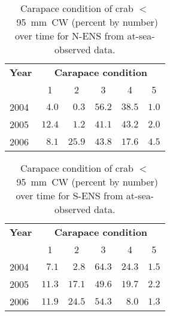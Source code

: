 \documentclass[11pt]{article}
\newcommand{\lt}{$<$}
\begin{document}
\clearpage \newpage
\begin{table}
  \caption{Carapace condition of crab \lt~95~mm~CW (percent by number) over time for N-ENS from at-sea-observed data.}
  \label{table.CC.small.north.obs}
 \begin{center}
\begin{tabular}{lrrrrr}
\hline\hline
\multicolumn{1}{l}{\bfseries Year}&
\multicolumn{5}{c}{\bfseries Carapace condition}
\\ \cline{2-6}
\multicolumn{1}{l}{}&
\multicolumn{1}{c}{1}&
\multicolumn{1}{c}{2}&
\multicolumn{1}{c}{3}&
\multicolumn{1}{c}{4}&
\multicolumn{1}{c}{5}
\\ \hline
2004 &$  4.0 $&$  0.3 $&$ 56.2 $&$ 38.5 $&$ 1.0 $\\
2005 &$ 12.4 $&$  1.2 $&$ 41.1 $&$ 43.2 $&$ 2.0 $\\
2006 &$  8.1 $&$ 25.9 $&$ 43.8 $&$ 17.6 $&$ 4.5 $\\
\hline
\end{tabular}
\end{center}
\end{table}


\begin{table}
\caption{Carapace condition of crab \lt~95~mm~CW (percent by number) over time for S-ENS from at-sea-observed data.}
\label{table.CC.small.south.obs}
\begin{center}
\begin{tabular}{lrrrrr}
\hline \hline
\multicolumn{1}{l}{\bfseries Year}&
\multicolumn{5}{c}{\bfseries Carapace condition}
\\ \cline{2-6}
\multicolumn{1}{l}{}&
\multicolumn{1}{c}{1}&
\multicolumn{1}{c}{2}&
\multicolumn{1}{c}{3}&
\multicolumn{1}{c}{4}&
\multicolumn{1}{c}{5}
\\ \hline
2004 &$  7.1 $&$  2.8 $&$ 64.3 $&$ 24.3 $&$ 1.5 $\\
2005 &$ 11.3 $&$ 17.1 $&$ 49.6 $&$ 19.7 $&$ 2.2 $\\
2006 &$ 11.9 $&$ 24.5 $&$ 54.3 $&$  8.0 $&$ 1.3 $\\
\hline
\end{tabular}
\end{center}
\end{table}
\end{document}
